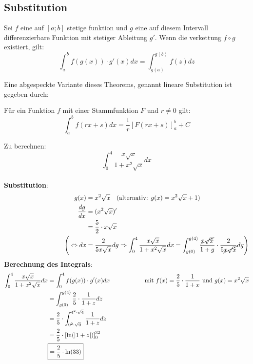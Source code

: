 \subsection{Substitution}
\begin{Theorem}
  Sei $f$ eine auf $[a;b]$ stetige funktion und $g$ eine auf diesem Intervall differenzierbare Funktion mit stetiger Ableitung
  $g'$. Wenn die verkettung $f \circ g$ existiert, gilt:
  $$\int_a^b f(g(x))\cdot g'(x)dx=\int_{g(a)}^{g(b)}f(z)dz$$
\end{Theorem}
Eine abgespeckte Variante dieses Theorems, genannt lineare Substitution ist gegeben durch:
\begin{Theorem}
  Für ein Funktion $f$ mit einer Stammfunktion $F$ und $r\neq 0$ gilt:
  $$\int_a^b f(rx+s)dx=\dfrac{1}{r}[F(rx+s)]_a^b + C$$
\end{Theorem}
\begin{Beispiel}
    Zu berechnen: $$\int_0^4 \dfrac{x\sqrt{x}}{1 + x^2\sqrt{x}} dx$$ \\
    \textbf{Substitution}:
    \begin{align*}
        \quad \qquad \qquad \qquad \qquad \qquad
        g(x) &= x^2\sqrt{x} \quad (\text{alternativ: } g(x) = x^2\sqrt{x} + 1) \\
        \dfrac{dg}{dx} &= (x^2\sqrt{x})' \\
                          &= \dfrac{5}{2} \cdot x\sqrt{x} \\
        \Bigg(\Leftrightarrow dx &= \dfrac{2}{5x\sqrt{x}}dg \Rightarrow \int_0^4 \dfrac{x\sqrt{x}}{1 + x^2\sqrt{x}} dx = \int_{g(0)}^{g(4)} \dfrac{\cancel{x\sqrt{x}}}{1 + g} \cdot \dfrac{2}{5\cancel{x\sqrt{x}}}dg\Bigg)
    \end{align*}
    \textbf{Berechnung des Integrals}:
    \begin{align*}
        \int_0^4 \dfrac{x\sqrt{x}}{1 + x^2\sqrt{x}} dx &= \int_0^4 f(g(x))\cdot g'(x)dx \text{\hspace{2cm}mit $f(x)=\dfrac{2}{5} \cdot \dfrac{1}{1+x}$ und $g(x) = x^2\sqrt{x}$}\\
        &= \int_{g(0)}^{g(4)} \dfrac{2}{5} \cdot\dfrac{1}{1 + z}dz \\
        &= \dfrac{2}{5} \cdot \int_{0^2\cdot\sqrt{0}}^{4^2\cdot\sqrt{4}} \dfrac{1}{1 + z}dz \\
        &= \dfrac{2}{5} \cdot \left[\ln(|1 + z|)\right]_0^{32} \\
        &\boxed{= \dfrac{2}{5} \cdot \ln(33)}
    \end{align*}
\end{Beispiel}

